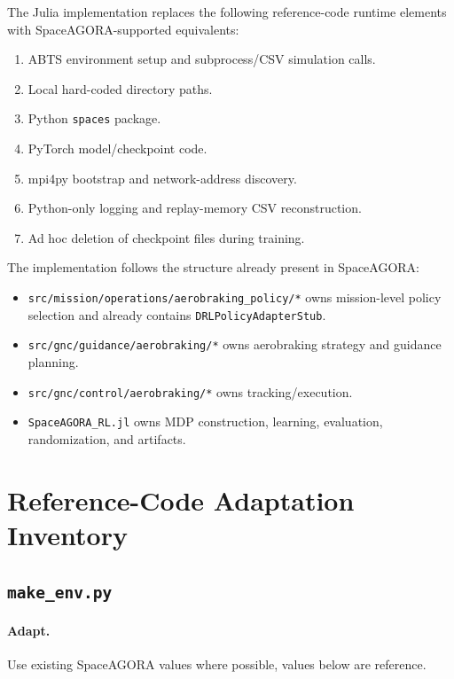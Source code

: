 \documentclass[11pt]{article}
\begin{document}
The Julia implementation replaces the following reference-code runtime elements with SpaceAGORA-supported equivalents:

\begin{enumerate}
\item ABTS environment setup and subprocess/CSV simulation calls.
\item Local hard-coded directory paths.
\item Python \texttt{spaces} package.
\item PyTorch model/checkpoint code.
\item mpi4py bootstrap and network-address discovery.
\item Python-only logging and replay-memory CSV reconstruction.
\item Ad hoc deletion of checkpoint files during training.
\end{enumerate}

The implementation follows the structure already present in SpaceAGORA:

\begin{itemize}
\item \texttt{src/mission/operations/aerobraking\_policy/*} owns mission-level policy selection and already contains \texttt{DRLPolicyAdapterStub}.
\item \texttt{src/gnc/guidance/aerobraking/*} owns aerobraking strategy and guidance planning.
\item \texttt{src/gnc/control/aerobraking/*} owns tracking/execution.
\item \texttt{SpaceAGORA\_RL.jl} owns MDP construction, learning, evaluation, randomization, and artifacts.


\end{itemize}
\section{Reference-Code Adaptation Inventory}

\subsection{\texttt{make\_env.py}}

\paragraph{Adapt.}

Use existing SpaceAGORA values where possible, values below are reference.
\end{document}

